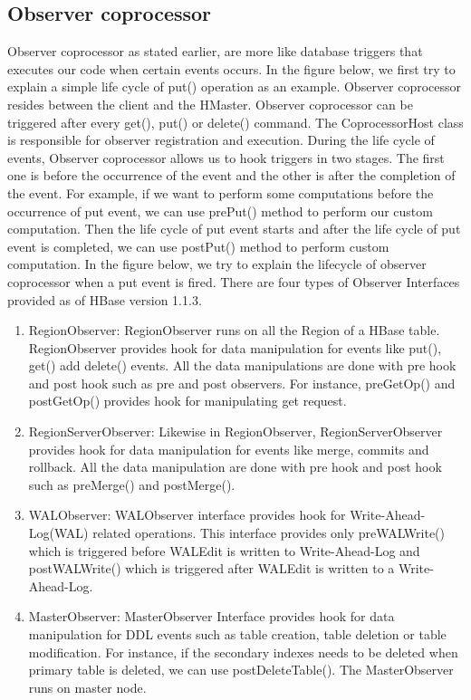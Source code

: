 \documentclass[11pt,a4paper,bibtotoc,idxtotoc,headsepline,footsepline,footexclude,BCOR12mm,DIV13]{scrbook}
\begin{document}
\subsection{Observer coprocessor}
\label{sec:observercoprocessor}
Observer coprocessor as stated earlier, are more like database triggers that executes our code when certain events occurs. In the figure below, we first try to explain a simple life cycle of put() operation as an example\cite{coprocessor:detail}. Observer coprocessor resides between the client and the HMaster. Observer coprocessor can be triggered after every get(), put() or delete() command. The CoprocessorHost class is responsible for observer registration and execution\cite{coprocessor:detail}.  During the life cycle of events, Observer coprocessor allows us to hook triggers in two stages. The first one is before the occurrence of the event and the other is after the completion of the event. For example, if we want to perform some computations before the occurrence of put event, we can use prePut() method to perform our custom computation. Then the life cycle of put event starts and after the life cycle of put event is completed, we can use postPut() method to perform custom computation. In the figure below, we try to explain the lifecycle of observer coprocessor when a put event is fired\cite{coprocessor:detail}.
\newline
There are four types of Observer Interfaces provided as of HBase version 1.1.3\cite{hbase:essential}.

\begin{enumerate}
	
\item RegionObserver: RegionObserver runs on all the Region of a HBase table. RegionObserver provides hook for data manipulation for events like put(), get() add delete() events. All the data manipulations are done with pre hook and post hook\cite{hbase:essential} such as pre and post observers. For instance, preGetOp() and postGetOp() provides hook for manipulating get request. 

\item RegionServerObserver: Likewise in RegionObserver, RegionServerObserver provides hook for data manipulation for events like merge, commits and rollback. All the data manipulation are done with pre hook and post hook such as preMerge() and postMerge(). 

\item WALObserver: WALObserver interface provides hook for Write-Ahead-Log(WAL)\cite{hbase:essential} related operations. This interface provides only preWALWrite() which is triggered before WALEdit is written to Write-Ahead-Log and postWALWrite() which is triggered after WALEdit is written to a Write-Ahead-Log.

\item MasterObserver: MasterObserver Interface provides hook for data manipulation for DDL events such as table creation, table deletion or table modification\cite{cloudera:instandupg}. For instance, if the secondary indexes needs to be deleted when primary table is deleted, we can use postDeleteTable(). The MasterObserver runs on master node.

\end{enumerate}
\end{document}
